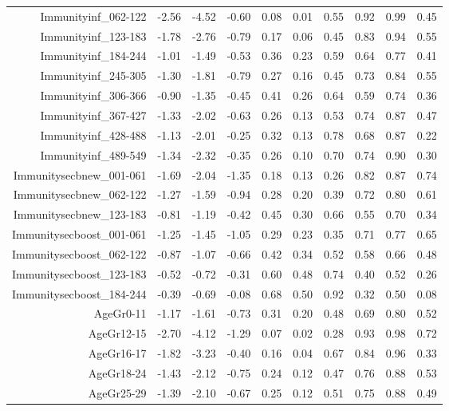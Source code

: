 \begin{table}[ht]
\begin{tabular}{rrrrrrrrrr}
  Immunityinf\_062-122 & -2.56 & -4.52 & -0.60 & 0.08 & 0.01 & 0.55 & 0.92 & 0.99 & 0.45 \\ 
  Immunityinf\_123-183 & -1.78 & -2.76 & -0.79 & 0.17 & 0.06 & 0.45 & 0.83 & 0.94 & 0.55 \\ 
  Immunityinf\_184-244 & -1.01 & -1.49 & -0.53 & 0.36 & 0.23 & 0.59 & 0.64 & 0.77 & 0.41 \\ 
  Immunityinf\_245-305 & -1.30 & -1.81 & -0.79 & 0.27 & 0.16 & 0.45 & 0.73 & 0.84 & 0.55 \\ 
  Immunityinf\_306-366 & -0.90 & -1.35 & -0.45 & 0.41 & 0.26 & 0.64 & 0.59 & 0.74 & 0.36 \\ 
  Immunityinf\_367-427 & -1.33 & -2.02 & -0.63 & 0.26 & 0.13 & 0.53 & 0.74 & 0.87 & 0.47 \\ 
  Immunityinf\_428-488 & -1.13 & -2.01 & -0.25 & 0.32 & 0.13 & 0.78 & 0.68 & 0.87 & 0.22 \\ 
  Immunityinf\_489-549 & -1.34 & -2.32 & -0.35 & 0.26 & 0.10 & 0.70 & 0.74 & 0.90 & 0.30 \\ 
  Immunitysecbnew\_001-061 & -1.69 & -2.04 & -1.35 & 0.18 & 0.13 & 0.26 & 0.82 & 0.87 & 0.74 \\ 
  Immunitysecbnew\_062-122 & -1.27 & -1.59 & -0.94 & 0.28 & 0.20 & 0.39 & 0.72 & 0.80 & 0.61 \\ 
  Immunitysecbnew\_123-183 & -0.81 & -1.19 & -0.42 & 0.45 & 0.30 & 0.66 & 0.55 & 0.70 & 0.34 \\ 
  Immunitysecboost\_001-061 & -1.25 & -1.45 & -1.05 & 0.29 & 0.23 & 0.35 & 0.71 & 0.77 & 0.65 \\ 
  Immunitysecboost\_062-122 & -0.87 & -1.07 & -0.66 & 0.42 & 0.34 & 0.52 & 0.58 & 0.66 & 0.48 \\ 
  Immunitysecboost\_123-183 & -0.52 & -0.72 & -0.31 & 0.60 & 0.48 & 0.74 & 0.40 & 0.52 & 0.26 \\ 
  Immunitysecboost\_184-244 & -0.39 & -0.69 & -0.08 & 0.68 & 0.50 & 0.92 & 0.32 & 0.50 & 0.08 \\ 
  AgeGr0-11 & -1.17 & -1.61 & -0.73 & 0.31 & 0.20 & 0.48 & 0.69 & 0.80 & 0.52 \\ 
  AgeGr12-15 & -2.70 & -4.12 & -1.29 & 0.07 & 0.02 & 0.28 & 0.93 & 0.98 & 0.72 \\ 
  AgeGr16-17 & -1.82 & -3.23 & -0.40 & 0.16 & 0.04 & 0.67 & 0.84 & 0.96 & 0.33 \\ 
  AgeGr18-24 & -1.43 & -2.12 & -0.75 & 0.24 & 0.12 & 0.47 & 0.76 & 0.88 & 0.53 \\ 
  AgeGr25-29 & -1.39 & -2.10 & -0.67 & 0.25 & 0.12 & 0.51 & 0.75 & 0.88 & 0.49 \\ 

\end{tabular}
\end{table}
